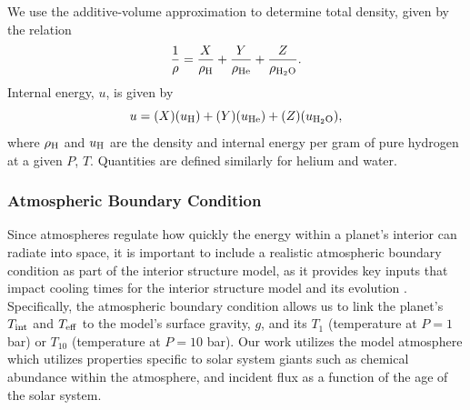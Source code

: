 \documentclass[11pt]{ucscthesisbs}
\begin{document}
We use the additive-volume approximation to determine total density, given by the relation
\begin{equation}
  \frac{1}{\rho} = \frac{X}{\rho_{\rm H}} + \frac{Y}{\rho_{\rm He}} + \frac{Z}{\rho_{\rm H_{2}O }}.
\end{equation}
Internal energy, $u$, is given by
\begin{equation}
 u = (X)(u_{\rm H}) + (Y)(u_{\rm He}) + (Z)(u_{\rm H_{2}O}),
\end{equation}
where $\rho_{\rm H}$ and $u_{\rm H}$ are the density and internal energy per gram of pure hydrogen at a given $P$, $T$. Quantities are defined similarly for helium and water.

\subsubsection{Atmospheric Boundary Condition}
Since atmospheres regulate how quickly the energy within a planet's interior can radiate into space, it is important to include a realistic atmospheric boundary condition as part of the interior structure model, as it provides key inputs that impact cooling times for the interior structure model and its evolution \citep{graboske_1975,fortney_2011}. Specifically, the atmospheric boundary condition allows us to link the planet's $T_{\rm int}$ and $T_{\rm eff}$ to the model's surface gravity, $g$, and its $T_{1}$ (temperature at $P = 1$ bar) or $T_{10}$ (temperature at $P = 10$ bar). Our work utilizes the \citep{fortney_2011} model atmosphere which utilizes properties specific to solar system giants such as chemical abundance within the atmosphere, and incident flux as a function of the age of the solar system. 
\end{document}
